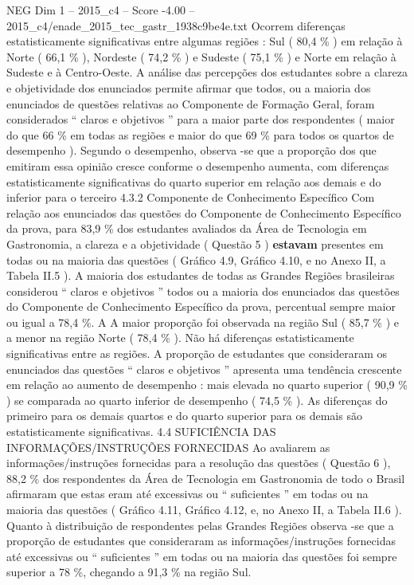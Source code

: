 \begin{textsample}{NEG Dim 1 – 2015\_c4 – Score -4.00 – 2015\_c4/enade\_2015\_tec\_gastr\_1938c9be4e.txt}
Ocorrem diferenças estatisticamente significativas entre algumas regiões : Sul ( 80,4 \% ) em relação à Norte ( 66,1 \% ), Nordeste ( 74,2 \% ) e Sudeste ( 75,1 \% ) e Norte em relação à Sudeste e à Centro-Oeste.
A análise das percepções dos estudantes sobre a clareza e objetividade dos enunciados permite afirmar que todos, ou a maioria dos enunciados de questões relativas ao Componente de Formação Geral, foram considerados “ claros e objetivos ” para a maior parte dos respondentes ( maior do que 66 \% em todas as regiões e maior do que 69 \% para todos os quartos de desempenho ).
Segundo o desempenho, observa -se que a proporção dos que emitiram essa opinião cresce conforme o desempenho aumenta, com diferenças estatisticamente significativas do quarto superior em relação aos demais e do inferior para o terceiro 4.3.2 Componente de Conhecimento Específico Com relação aos enunciados das questões do Componente de Conhecimento Específico da prova, para 83,9 \% dos estudantes avaliados da Área de Tecnologia em Gastronomia, a clareza e a objetividade ( Questão 5 ) \textbf{estavam} presentes em todas ou na maioria das questões ( Gráfico 4.9, Gráfico 4.10, e no Anexo II, a Tabela II.5 ).
A maioria dos estudantes de todas as Grandes Regiões brasileiras considerou “ claros e objetivos ” todos ou a maioria dos enunciados das questões do Componente de Conhecimento Específico da prova, percentual sempre maior ou igual a 78,4 \%.
A A maior proporção foi observada na região Sul ( 85,7 \% ) e a menor na região Norte ( 78,4 \% ).
Não há diferenças estatisticamente significativas entre as regiões.
A proporção de estudantes que consideraram os enunciados das questões “ claros e objetivos ” apresenta uma tendência crescente em relação ao aumento de desempenho : mais elevada no quarto superior ( 90,9 \% ) se comparada ao quarto inferior de desempenho ( 74,5 \% ).
As diferenças do primeiro para os demais quartos e do quarto superior para os demais são estatisticamente significativas. 4.4 SUFICIÊNCIA DAS INFORMAÇÕES/INSTRUÇÕES FORNECIDAS Ao avaliarem as informações/instruções fornecidas para a resolução das questões ( Questão 6 ), 88,2 \% dos respondentes da Área de Tecnologia em Gastronomia de todo o Brasil afirmaram que estas eram até excessivas ou “ suficientes ” em todas ou na maioria das questões ( Gráfico 4.11, Gráfico 4.12, e, no Anexo II, a Tabela II.6 ).
Quanto à distribuição de respondentes pelas Grandes Regiões observa -se que a proporção de estudantes que consideraram as informações/instruções fornecidas até excessivas ou “ suficientes ” em todas ou na maioria das questões foi sempre superior a 78 \%, chegando a 91,3 \% na região Sul.

\end{textsample}

